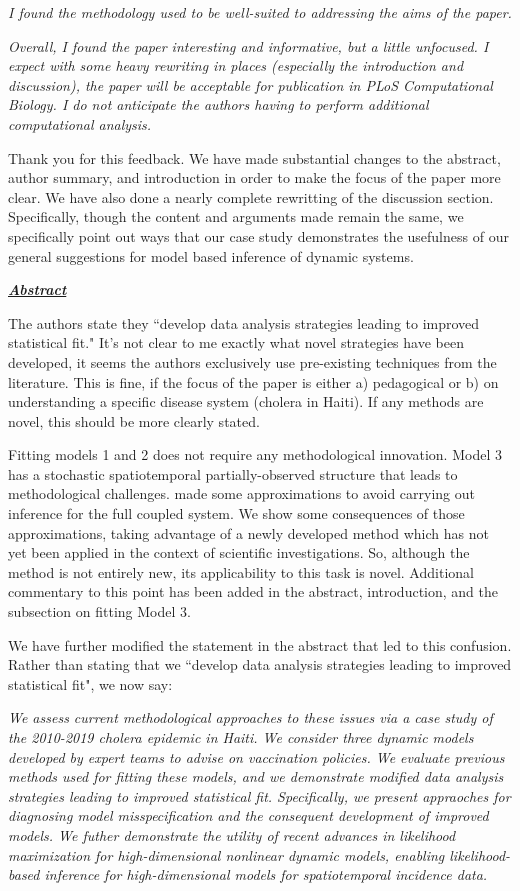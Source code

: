 \documentclass[11pt]{article}
\newcommand\report[1]{{\color{mygreen} \vspace{1mm}\hspace{0.25in}\parbox{6in}{\em #1}}}
\newcommand\article[1]{{\color{blue} \vspace{1mm}\hspace{0.25in}\parbox{6in}{\em #1}}}
\begin{document}
\report{
  I found the methodology used to be well-suited to addressing the aims of the paper.
}

\report{
  Overall, I found the paper interesting and informative, but a little unfocused. I expect with some heavy rewriting in places (especially the introduction and discussion), the paper will be acceptable for publication in PLoS Computational Biology. I do not anticipate the authors having to perform additional computational analysis.
}

Thank you for this feedback.
We have made substantial changes to the abstract, author summary, and introduction in order to make the focus of the paper more clear.
We have also done a nearly complete rewritting of the discussion section.
Specifically, though the content and arguments made remain the same, we specifically point out ways that our case study demonstrates the usefulness of our general suggestions for model based inference of dynamic systems.

\report{
  \textbf{\underline{Abstract}}

  The authors state they ``develop data analysis strategies leading to improved statistical fit." It's not clear to me exactly what novel strategies have been developed, it seems the authors exclusively use pre-existing techniques from the literature. This is fine, if the focus of the paper is either a) pedagogical or b) on understanding a specific disease system (cholera in Haiti). If any methods are novel, this should be more clearly stated.
}

Fitting models 1 and 2 does not require any methodological innovation. Model 3 has a stochastic spatiotemporal partially-observed structure that leads to methodological challenges. \cite{lee20} made some approximations to avoid carrying out inference for the full coupled system. We show some consequences of those approximations, taking advantage of a newly developed method which has not yet been applied in the context of scientific investigations. So, although the method is not entirely new, its applicability to this task is novel.
Additional commentary to this point has been added in the abstract, introduction, and the subsection on fitting Model 3.

We have further modified the statement in the abstract that led to this confusion. Rather than stating that we ``develop data analysis strategies leading to improved statistical fit", we now say:

\article{We assess current methodological approaches to these issues via a case study of the 2010-2019 cholera epidemic in Haiti. We consider three dynamic models developed by expert teams to advise on vaccination policies. We evaluate previous methods used for fitting these models, and we demonstrate modified data analysis strategies leading to improved statistical fit. Specifically, we present appraoches for diagnosing model misspecification and the consequent development of improved models. We futher demonstrate the utility of recent advances in likelihood maximization for high-dimensional nonlinear dynamic models, enabling likelihood-based inference for high-dimensional models for spatiotemporal incidence data.}
\end{document}
